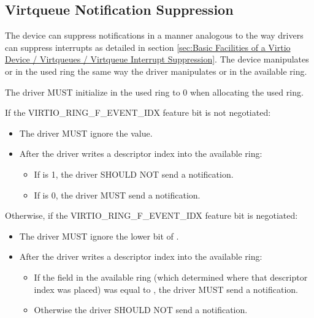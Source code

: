 \subsection{Virtqueue Notification Suppression}\label{sec:Basic Facilities of a Virtio Device / Virtqueues / Virtqueue Notification Suppression}

The device can suppress notifications in a manner analogous to the way
drivers can suppress interrupts as detailed in section \ref{sec:Basic Facilities of a Virtio Device / Virtqueues / Virtqueue Interrupt Suppression}.
The device manipulates  or  in the used ring the
same way the driver manipulates  or  in the available ring.


The driver MUST initialize  in the used ring to 0 when
allocating the used ring.

If the VIRTIO_RING_F_EVENT_IDX feature bit is not negotiated:
\begin{itemize}
\item The driver MUST ignore the  value.
\item After the driver writes a descriptor index into the available ring:
  \begin{itemize}
        \item If  is 1, the driver SHOULD NOT send a notification.
        \item If  is 0, the driver MUST send a notification.
  \end{itemize}
\end{itemize}

Otherwise, if the VIRTIO_RING_F_EVENT_IDX feature bit is negotiated:
\begin{itemize}
\item The driver MUST ignore the lower bit of .
\item After the driver writes a descriptor index into the available ring:
  \begin{itemize}
        \item If the  field in the available ring (which determined
          where that descriptor index was placed) was equal to
          , the driver MUST send a notification.
        \item Otherwise the driver SHOULD NOT send a notification.
  \end{itemize}
\end{itemize}

